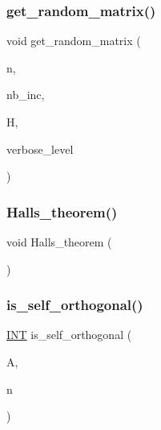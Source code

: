 \mbox{\label{test_8_c_aff32612e997c6abf4b6f22b9185b0e67}} 
\subsubsection{\texorpdfstring{get\+\_\+random\+\_\+matrix()}{get\_random\_matrix()}}
{\footnotesize\ttfamily void get\+\_\+random\+\_\+matrix (\begin{DoxyParamCaption}\item[{\mbox{\hyperlink{galois_8h_a09fddde158a3a20bd2dcadb609de11dc}{I\+NT}}}]{n,  }\item[{\mbox{\hyperlink{galois_8h_a09fddde158a3a20bd2dcadb609de11dc}{I\+NT}}}]{nb\+\_\+inc,  }\item[{\mbox{\hyperlink{classmatrix}{matrix}} \&}]{H,  }\item[{\mbox{\hyperlink{galois_8h_a09fddde158a3a20bd2dcadb609de11dc}{I\+NT}}}]{verbose\+\_\+level }\end{DoxyParamCaption})}

\mbox{\label{test_8_c_aba940d15eaa8abf972749535a2259ebe}} 
\subsubsection{\texorpdfstring{Halls\+\_\+theorem()}{Halls\_theorem()}}
{\footnotesize\ttfamily void Halls\+\_\+theorem (\begin{DoxyParamCaption}{ }\end{DoxyParamCaption})}

\mbox{\label{test_8_c_a01348fd2718cf44200633898510cb4dd}} 
\subsubsection{\texorpdfstring{is\+\_\+self\+\_\+orthogonal()}{is\_self\_orthogonal()}}
{\footnotesize\ttfamily \mbox{\hyperlink{galois_8h_a09fddde158a3a20bd2dcadb609de11dc}{I\+NT}} is\+\_\+self\+\_\+orthogonal (\begin{DoxyParamCaption}\item[{\mbox{\hyperlink{galois_8h_a09fddde158a3a20bd2dcadb609de11dc}{I\+NT}} $\ast$}]{A,  }\item[{\mbox{\hyperlink{galois_8h_a09fddde158a3a20bd2dcadb609de11dc}{I\+NT}}}]{n }\end{DoxyParamCaption})}

